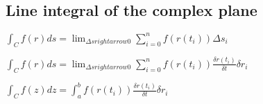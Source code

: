 
\subsection{Line integral of the complex plane}

\(\int_C f(r) ds=\lim_{\Delta s rightarrow 0 }\sum_{i=0}^n f(r(t_i))\Delta s_i\)

\(\int_C f(r) ds=\lim_{\Delta s rightarrow 0 }\sum_{i=0}^n f(r(t_i))\frac{\delta r(t_i)}{\delta t}\delta r_i\)

\(\int_C f(z) dz=\int_a^b f(r(t_i))\frac{\delta r(t_i)}{\delta t}\delta r_i\)

